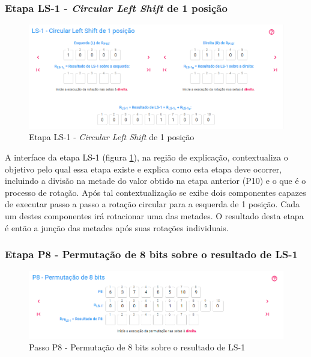 \subsubsection{Etapa LS-1 - \textit{Circular Left Shift} de 1 posição}

\begin{figure}[H]
    \centering
    \caption{Etapa LS-1 - \textit{Circular Left Shift} de 1 posição}
    \label{fig:uils1}
    \includegraphics[width=1\linewidth]{UI/UILS1.png}
\end{figure}

A interface da etapa LS-1 (figura \ref{fig:uils1}), na região de explicação, contextualiza o objetivo pelo qual essa etapa existe e explica como esta etapa deve ocorrer, incluindo a divisão na metade do valor obtido na etapa anterior (P10) e o que é o processo de rotação. Após tal contextualização se exibe dois componentes capazes de executar passo a passo a rotação circular para a esquerda de 1 posição. Cada um destes componentes irá rotacionar uma das metades. O resultado desta etapa é então a junção das metades após suas rotações individuais.

\subsubsection{Etapa P8 - Permutação de 8 bits sobre o resultado de LS-1}

\begin{figure}[H]
    \centering
    \caption{Passo P8 - Permutação de 8 bits sobre o resultado de LS-1}
    \label{fig:uip81}
    \includegraphics[width=1\linewidth]{UI/UIP81.png}
\end{figure}

